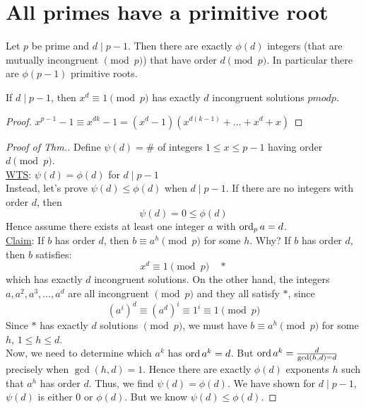 \section{All primes have a primitive root}
    \begin{theorem}
        Let $p$ be prime and $d\mid p-1$. Then there are exactly $\phi(d)$
        integers (that are mutually incongruent $\pmod{p}$) that have
        order $d\pmod{p}$. In particular there are $\phi(p-1)$ primitive roots.
        \begin{lemma}
            If $d\mid p-1$, then $x^d\equiv 1\pmod{p}$ has exactly $d$ incongruent
            solutions $pmod{p}$.
            \begin{proof}
                $x^{p-1}-1\equiv x^{dk}-1 = (x^d - 1)(x^{d(k-1)}+\dots+x^d+x)$
            \end{proof}
        \end{lemma}
        \begin{proof} [Proof of Thm.]
            Define $\psi(d) = \#$ of integers $1\le x\le p-1$ having order $d\pmod{p}$. \\

            \underline{WTS}: $\psi(d) = \phi(d)$ for $d\mid p-1$ \\
            Instead, let's prove $\psi(d)\le \phi(d)$ when $d\mid p-1$. 
            If there are no integers with order $d$, then
            \[ \psi(d) = 0\le \phi(d) \]
            Hence assume there exists at least one integer $a$ with $\operatorname{ord}_{p}{a} = d$. \\

            \underline{Claim}: If $b$ has order $d$, then $b\equiv a^h\pmod{p}$ for some $h$.
            Why? If $b$ has order $d$, then $b$ satisfies:
            \[ x^d\equiv 1\pmod{p} \quad*\]
            which has exactly $d$ incongruent solutions. On the other hand,
            the integers $a,a^2,a^3,\dots,a^d$ are all incongruent $\pmod{p}$
            and they all satisfy $*$, since 
            \[ (a^{i})^d \equiv (a^d)^i \equiv 1^i \equiv 1 \pmod{p} \]
            Since $*$ has exactly $d$ solutions $\pmod{p}$, we must have 
            $b\equiv a^h\pmod{p}$ for some $h$, $1\le h\le d$. \\

            Now, we need to determine which $a^k$ has $\operatorname{ord}{a^k} = d$. 
            But $\operatorname{ord}{a^k} = \frac{d}{\gcd(h,d) = d}$
            precisely when $\gcd(h,d) = 1$. Hence there are exactly
            $\phi(d)$ exponents $h$ such that $a^h$ has order $d$. 
            Thus, we find $\psi(d)=\phi(d)$. We have shown for $d\mid p-1$,
            $\psi(d)$ is either $0$ or $\phi(d)$. But we know $\psi(d)\le \phi(d)$.


\end{proof}
\end{theorem}
